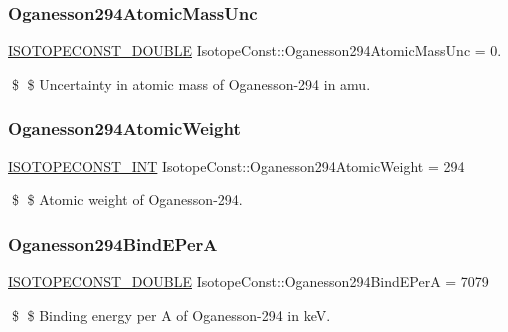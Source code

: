 \subsubsection{\texorpdfstring{Oganesson294\+Atomic\+Mass\+Unc}{Oganesson294AtomicMassUnc}}
{\footnotesize\ttfamily \mbox{\hyperlink{group___isotope_const-_macros_ga8f45a7272ce02c0b4c65c44636ed719a}{I\+S\+O\+T\+O\+P\+E\+C\+O\+N\+S\+T\+\_\+\+D\+O\+U\+B\+LE}} Isotope\+Const\+::\+Oganesson294\+Atomic\+Mass\+Unc = 0.}

\$ \$ Uncertainty in atomic mass of Oganesson-\/294 in amu. \mbox{\label{group___isotope_const-_oganesson-_og294_ga476ba86e2b5b78b916da3b2f87b18e5a}} 
\subsubsection{\texorpdfstring{Oganesson294\+Atomic\+Weight}{Oganesson294AtomicWeight}}
{\footnotesize\ttfamily \mbox{\hyperlink{group___isotope_const-_macros_ga5f18360b3e99483a35c32d789e62621c}{I\+S\+O\+T\+O\+P\+E\+C\+O\+N\+S\+T\+\_\+\+I\+NT}} Isotope\+Const\+::\+Oganesson294\+Atomic\+Weight = 294}

\$ \$ Atomic weight of Oganesson-\/294. \mbox{\label{group___isotope_const-_oganesson-_og294_ga109b204574a8f79656ea2be445410f4e}} 
\subsubsection{\texorpdfstring{Oganesson294\+Bind\+E\+PerA}{Oganesson294BindEPerA}}
{\footnotesize\ttfamily \mbox{\hyperlink{group___isotope_const-_macros_ga8f45a7272ce02c0b4c65c44636ed719a}{I\+S\+O\+T\+O\+P\+E\+C\+O\+N\+S\+T\+\_\+\+D\+O\+U\+B\+LE}} Isotope\+Const\+::\+Oganesson294\+Bind\+E\+PerA = 7079}

\$ \$ Binding energy per A of Oganesson-\/294 in keV. \mbox{\label{group___isotope_const-_oganesson-_og294_gaa5a780960b2a4d53253eb8c420e39826}} 
